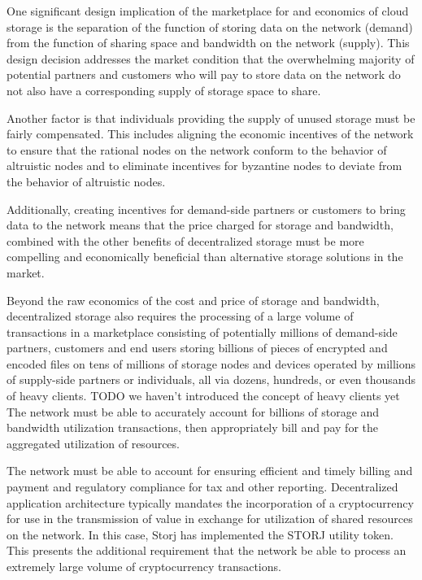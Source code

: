 \documentclass[11pt,fleqn,openany]{book}
\newcommand{\todo}[1]{{\color{red} TODO #1 }}
\begin{document}
One significant design implication of the marketplace for and economics of
cloud storage is the separation of the function of storing data on the network
(demand) from the function of sharing space and bandwidth on the network
(supply).
This design decision addresses the market condition that the overwhelming
majority of potential partners and customers who will pay to store data on the
network do not also have a corresponding supply of storage space to share.

Another factor is that individuals providing the supply of unused storage must
be fairly compensated.
This includes aligning the economic incentives of the network to ensure that
the rational nodes on the network conform to the behavior of altruistic nodes
and to eliminate incentives for byzantine nodes to deviate from the
behavior of altruistic nodes.

Additionally, creating incentives for demand-side partners or customers to
bring data to the network means that the price charged for storage and
bandwidth, combined with the other benefits of decentralized storage must be
more compelling and economically beneficial than alternative storage solutions
in the market.

Beyond the raw economics of the cost and price of storage and bandwidth,
decentralized storage also requires the processing of a large volume of
transactions in a marketplace consisting of potentially millions of demand-side
partners, customers and end users storing billions of pieces of encrypted and
encoded files on tens of millions of storage nodes and devices operated by
millions of supply-side partners or individuals, all via dozens, hundreds, or
even thousands of heavy clients. \todo{we haven't introduced the concept
of heavy clients yet}
The network must be able to accurately account for billions of storage and
bandwidth utilization transactions, then appropriately bill and pay for the
aggregated utilization of resources.

The network must be able to account for ensuring efficient and timely billing
and payment and regulatory compliance for tax and other reporting.
Decentralized application architecture typically mandates the incorporation of
a cryptocurrency for use in the transmission of value in exchange for
utilization of shared resources on the network.
In this case, Storj has implemented the STORJ utility token.
This presents the additional requirement that the network be able to process
an extremely large volume of cryptocurrency transactions.
\end{document}
